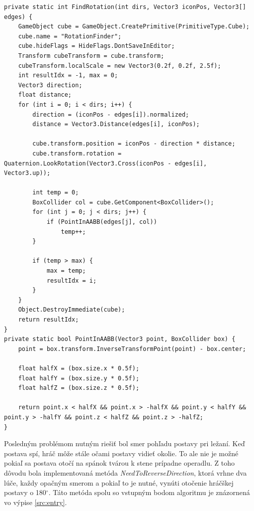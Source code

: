 \documentclass[slovak, bachelorpractice]{diploma}
\begin{document}
\vspace{10pt}
\begin{lstlisting}[label=src:findRot,caption={Získanie korektnej rotácie hráča pri ležaní}]
private static int FindRotation(int dirs, Vector3 iconPos, Vector3[] edges) {
    GameObject cube = GameObject.CreatePrimitive(PrimitiveType.Cube);
    cube.name = "RotationFinder";
    cube.hideFlags = HideFlags.DontSaveInEditor;
    Transform cubeTransform = cube.transform;
    cubeTransform.localScale = new Vector3(0.2f, 0.2f, 2.5f);
    int resultIdx = -1, max = 0;
    Vector3 direction;
    float distance;
    for (int i = 0; i < dirs; i++) {
        direction = (iconPos - edges[i]).normalized;
        distance = Vector3.Distance(edges[i], iconPos);

        cube.transform.position = iconPos - direction * distance;
        cube.transform.rotation = Quaternion.LookRotation(Vector3.Cross(iconPos - edges[i], Vector3.up));

        int temp = 0;
        BoxCollider col = cube.GetComponent<BoxCollider>();
        for (int j = 0; j < dirs; j++) {
            if (PointInAABB(edges[j], col))
                temp++;
        }

        if (temp > max) {
            max = temp;
            resultIdx = i;
        }
    }
    Object.DestroyImmediate(cube);
    return resultIdx;
}
private static bool PointInAABB(Vector3 point, BoxCollider box) {
    point = box.transform.InverseTransformPoint(point) - box.center;

    float halfX = (box.size.x * 0.5f);
    float halfY = (box.size.y * 0.5f);
    float halfZ = (box.size.z * 0.5f);

    return point.x < halfX && point.x > -halfX && point.y < halfY && point.y > -halfY && point.z < halfZ && point.z > -halfZ;
}
\end{lstlisting}

Posledným problémom nutným riešiť bol smer pohľadu postavy pri ležaní. Keď postava spí, hráč môže stále očami postavy vidieť okolie. To ale nie je možné pokiaľ sa postava otočí na spánok tvárou k stene prípadne operadlu. Z toho dôvodu bola implementovaná metóda \textit{NeedToReverseDirection}, ktorá vrhne dva lúče, každy opačným smerom a pokiaľ to je nutné, vynúti otočenie hráčškej postavy o 180$^{\circ}$. Táto metóda spolu so vstupným bodom algoritmu je znázornená vo výpise \ref{src:entry}.
\end{document}
